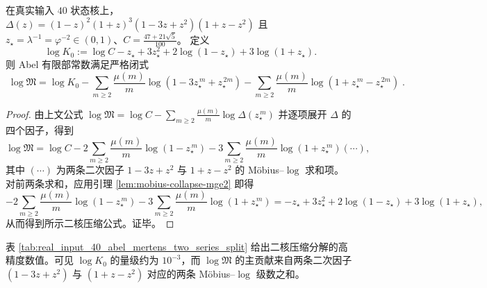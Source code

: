 \begin{proposition}\label{prop:real-input-40-mertens-two-series}
在真实输入 $40$ 状态核上，
\(
\Delta(z)=(1-z)^2(1+z)^3(1-3z+z^2)(1+z-z^2)
\)
且 \(z_\star=\lambda^{-1}=\varphi^{-2}\in(0,1)\)、\(C=\frac{47+21\sqrt5}{100}\)。
定义
\[
\log K_0
:=\log C-z_\star+3z_\star^2+2\log(1-z_\star)+3\log(1+z_\star).
\]
则 Abel 有限部常数满足严格闭式
\[
\boxed{\;
\log\mathfrak{M}
=
\log K_0
-\sum_{m\ge 2}\frac{\mu(m)}{m}\log(1-3z_\star^{\,m}+z_\star^{\,2m})
-\sum_{m\ge 2}\frac{\mu(m)}{m}\log(1+z_\star^{\,m}-z_\star^{\,2m})\; }.
\]
\end{proposition}
\begin{proof}
由上文公式
\(
\log\mathfrak{M}
=\log C-\sum_{m\ge 2}\frac{\mu(m)}{m}\log \Delta(z_\star^{\,m})
\)
并逐项展开 \(\Delta\) 的四个因子，得到
\[
\log\mathfrak{M}
=\log C
-2\sum_{m\ge 2}\frac{\mu(m)}{m}\log(1-z_\star^{\,m})
-3\sum_{m\ge 2}\frac{\mu(m)}{m}\log(1+z_\star^{\,m})
(\cdots),
\]
其中 \((\cdots)\) 为两条二次因子 \(1-3z+z^2\) 与 \(1+z-z^2\) 的 Möbius--$\log$ 求和项。
对前两条求和，应用引理 \ref{lem:mobius-collapse-mge2} 即得
\[
-2\sum_{m\ge 2}\frac{\mu(m)}{m}\log(1-z_\star^{\,m})
-3\sum_{m\ge 2}\frac{\mu(m)}{m}\log(1+z_\star^{\,m})
=-z_\star+3z_\star^2+2\log(1-z_\star)+3\log(1+z_\star),
\]
从而得到所示二核压缩公式。证毕。
\end{proof}

\begin{remark}\label{rem:real-input-40-mertens-two-series-numeric}
表 \ref{tab:real_input_40_abel_mertens_two_series_split} 给出二核压缩分解的高精度数值。可见
\(\log K_0\) 的量级约为 \(10^{-3}\)，而 \(\log\mathfrak{M}\) 的主贡献来自两条二次因子
\((1-3z+z^2)\) 与 \((1+z-z^2)\) 对应的两条 Möbius--$\log$ 级数之和。

\end{remark}

